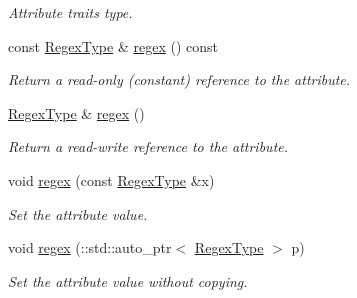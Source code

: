 \begin{DoxyCompactItemize}
\begin{DoxyCompactList}\small\item\em Attribute traits type. \item\end{DoxyCompactList}\item 
const \hyperlink{classopenstack_1_1xml_1_1RateLimit_a548c5e538a1408da78611116ac40aab2}{RegexType} \& \hyperlink{classopenstack_1_1xml_1_1RateLimit_a8f59d3316f42dd2e7adec424fdac85d2}{regex} () const 
\begin{DoxyCompactList}\small\item\em Return a read-\/only (constant) reference to the attribute. \item\end{DoxyCompactList}\item 
\hyperlink{classopenstack_1_1xml_1_1RateLimit_a548c5e538a1408da78611116ac40aab2}{RegexType} \& \hyperlink{classopenstack_1_1xml_1_1RateLimit_ad4f178be88f1810e57c76ab37975b0ce}{regex} ()
\begin{DoxyCompactList}\small\item\em Return a read-\/write reference to the attribute. \item\end{DoxyCompactList}\item 
void \hyperlink{classopenstack_1_1xml_1_1RateLimit_a123f76f7cb2532ffb2e325d33053ed5b}{regex} (const \hyperlink{classopenstack_1_1xml_1_1RateLimit_a548c5e538a1408da78611116ac40aab2}{RegexType} \&x)
\begin{DoxyCompactList}\small\item\em Set the attribute value. \item\end{DoxyCompactList}\item 
void \hyperlink{classopenstack_1_1xml_1_1RateLimit_a94d28640958e5eafc806dd8a65a58b95}{regex} (::std::auto\_\-ptr$<$ \hyperlink{classopenstack_1_1xml_1_1RateLimit_a548c5e538a1408da78611116ac40aab2}{RegexType} $>$ p)
\begin{DoxyCompactList}\small\item\em Set the attribute value without copying. \item\end{DoxyCompactList}\end{DoxyCompactItemize}
